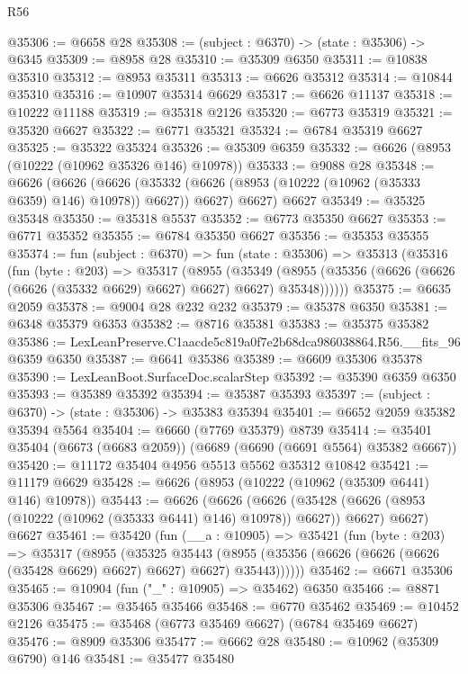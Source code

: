 \begin{lexlean}{R56}
\begin{coremodule}
@35306 := @6658 @28
@35308 := (subject : @6370) -> (state : @35306) -> @6345
@35309 := @8958 @28
@35310 := @35309 @6350
@35311 := @10838 @35310
@35312 := @8953 @35311
@35313 := @6626 @35312
@35314 := @10844 @35310
@35316 := @10907 @35314 @6629
@35317 := @6626 @11137
@35318 := @10222 @11188
@35319 := @35318 @2126
@35320 := @6773 @35319
@35321 := @35320 @6627
@35322 := @6771 @35321
@35324 := @6784 @35319 @6627
@35325 := @35322 @35324
@35326 := @35309 @6359
@35332 := @6626 (@8953 (@10222 (@10962 @35326 @146) @10978))
@35333 := @9088 @28
@35348 := @6626
    (@6626
      (@6626 (@35332 (@6626 (@8953 (@10222 (@10962 (@35333 @6359) @146) @10978)) @6627)) @6627)
      @6627)
    @6627
@35349 := @35325 @35348
@35350 := @35318 @5537
@35352 := @6773 @35350 @6627
@35353 := @6771 @35352
@35355 := @6784 @35350 @6627
@35356 := @35353 @35355
@35374 := fun (subject : @6370) =>
  fun (state : @35306) =>
  @35313
    (@35316
      (fun (byte : @203) =>
      @35317
        (@8955
          (@35349
            (@8955 (@35356 (@6626 (@6626 (@6626 (@35332 @6629) @6627) @6627) @6627) @35348))))))
@35375 := @6635 @2059
@35378 := @9004 @28 @232 @232
@35379 := @35378 @6350
@35381 := @6348 @35379 @6353
@35382 := @8716 @35381
@35383 := @35375 @35382
@35386 := LexLeanPreserve.C1aacde5c819a0f7e2b68dca986038864.R56.__fits_96 @6359 @6350
@35387 := @6641 @35386
@35389 := @6609 @35306 @35378
@35390 := LexLeanBoot.SurfaceDoc.scalarStep
@35392 := @35390 @6359 @6350
@35393 := @35389 @35392
@35394 := @35387 @35393
@35397 := (subject : @6370) -> (state : @35306) -> @35383 @35394
@35401 := @6652 @2059 @35382 @35394 @5564
@35404 := @6660 (@7769 @35379) @8739
@35414 := @35401 @35404 (@6673 (@6683 @2059)) (@6689 (@6690 (@6691 @5564) @35382 @6667))
@35420 := @11172 @35404 @4956 @5513 @5562 @35312 @10842
@35421 := @11179 @6629
@35428 := @6626 (@8953 (@10222 (@10962 (@35309 @6441) @146) @10978))
@35443 := @6626
    (@6626
      (@6626 (@35428 (@6626 (@8953 (@10222 (@10962 (@35333 @6441) @146) @10978)) @6627)) @6627)
      @6627)
    @6627
@35461 := @35420
    (fun (__a : @10905) =>
    @35421
      (fun (byte : @203) =>
      @35317
        (@8955
          (@35325
            @35443
            (@8955 (@35356 (@6626 (@6626 (@6626 (@35428 @6629) @6627) @6627) @6627) @35443))))))
@35462 := @6671 @35306
@35465 := @10904 (fun ("_" : @10905) => @35462) @6350
@35466 := @8871 @35306
@35467 := @35465 @35466
@35468 := @6770 @35462
@35469 := @10452 @2126
@35475 := @35468 (@6773 @35469 @6627) (@6784 @35469 @6627)
@35476 := @8909 @35306
@35477 := @6662 @28
@35480 := @10962 (@35309 @6790) @146
@35481 := @35477 @35480

\end{coremodule}
\end{lexlean}
